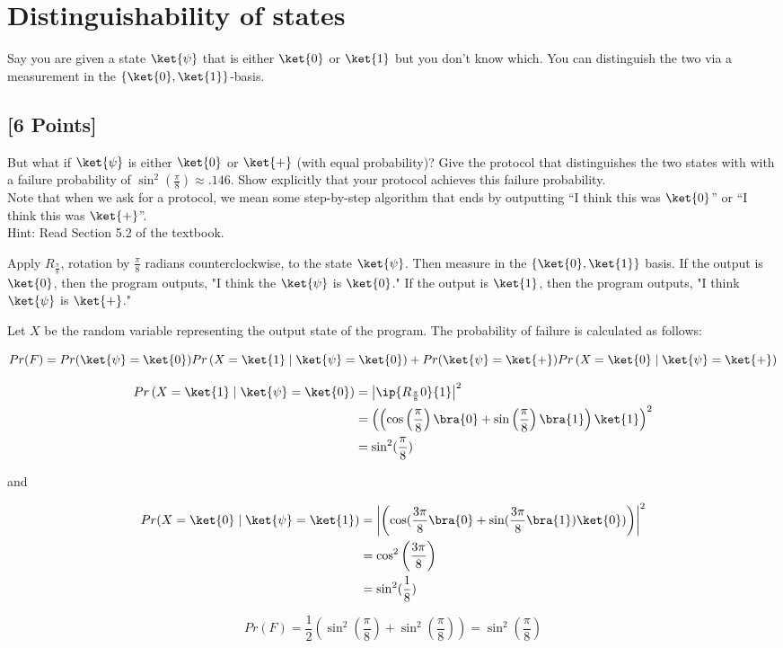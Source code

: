 \documentclass[11pt]{article}
\newcommand{\abs}[1]{\left\lvert #1\right\rvert}
\begin{document}
\section{Distinguishability of states} Say you are given a state $\ket{\psi}$ that is either $\ket{0}$ or $\ket{1}$ but you don't know which. You can distinguish the two via a measurement in the $\{\ket{0}, \ket{1}\}$-basis.

\subsection{[6 Points]} But what if $\ket{\psi}$ is either $\ket{0}$ or $\ket{+}$ (with equal probability)? Give the protocol that distinguishes the two states with with a failure probability of $\sin^2(\frac{\pi}{8})\approx .146$. Show explicitly that your protocol achieves this failure probability.
\\ Note that when we ask for a protocol, we mean some step-by-step algorithm that ends by outputting ``I think this was $\ket{0}$'' or ``I think this was $\ket{+}$''.
\\ Hint: Read Section 5.2 of the textbook.

\begin{solution}
    Apply $R_{\frac{\pi}{8}}$, rotation by $\frac{\pi}{8}$ radians counterclockwise, to the state $\ket{\psi}$. Then measure in the $\left\{ \ket{0}, \ket{1} \right\}$ basis. If the output is $\ket{0}$, then the program outputs, "I think the $\ket{\psi}$ is $\ket{0}$." If the output is $\ket{1}$, then the program outputs, "I think $\ket{\psi}$ is $\ket{+}$."        
    

    Let $X$ be the random variable representing the output state of the program. The probability of failure is calculated as follows: 


    \[Pr(F) = Pr(\ket{\psi} = \ket{0})Pr\left(X = \ket{1} \mid \ket{\psi} = \ket{0}\right) + Pr(\ket{\psi} = \ket{+}) Pr\left(X = \ket{0} \mid \ket{\psi} = \ket{+}\right)\]

    \begin{align*}
        Pr \left(X = \ket{1} \mid \ket{\psi} = \ket{0} \right) &= \abs{\ip{R_{\frac{\pi}{8}} 0 }{1}}^2 \\ 
        &= \left(\left(\cos\left(\frac{\pi}{8}\right) \bra{0} + \sin\left(\frac{\pi}{8}\right) \bra{1}\right) \ket{1}\right)^2 \\
        &= \sin^2 (\frac{\pi}{8})
    \end{align*}

    and 

    \begin{align*}
        Pr(X = \ket{0} \mid \ket{\psi} = \ket{1}) &= \abs{\left(\cos(\frac{3 \pi}{8} \bra{0} + \sin(\frac{3 \pi}{8} \bra{1}) \ket{0})\right)}^2 \\
        &= \cos^2\left(\frac{3 \pi}{8}\right) \\
        &= \sin^2(\frac{1}{8})
    \end{align*}

    \[Pr(F) = \frac{1}{2}(\sin^2(\frac{\pi}{8}) + \sin^2(\frac{\pi}{8})) = \sin^2\left(\frac{\pi}{8}\right)\] 
\end{solution}
\end{document}
